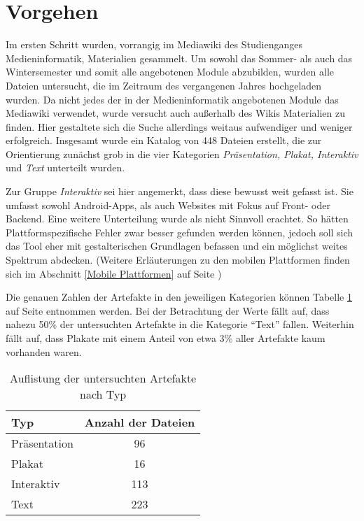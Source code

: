 
\section{Vorgehen}
Im ersten Schritt wurden, vorrangig im Mediawiki des Studienganges Medieninformatik, Materialien gesammelt. Um sowohl das Sommer- als auch das Wintersemester und somit alle angebotenen Module abzubilden, wurden alle Dateien untersucht, die im Zeitraum des vergangenen Jahres hochgeladen wurden.
Da nicht jedes der in der Medieninformatik angebotenen Module das Mediawiki verwendet, wurde versucht auch außerhalb des Wikis Materialien zu finden. Hier gestaltete sich die Suche allerdings weitaus aufwendiger und weniger erfolgreich.
Insgesamt wurde ein Katalog von 448 Dateien erstellt, die zur Orientierung zunächst grob in die vier Kategorien \textit{Präsentation, Plakat, Interaktiv} und \textit{Text} unterteilt wurden.

Zur Gruppe \textit{Interaktiv} sei hier angemerkt, dass diese bewusst weit gefasst ist. Sie umfasst sowohl Android-Apps, als auch Websites mit Fokus auf Front- oder Backend.
Eine weitere Unterteilung wurde als nicht Sinnvoll erachtet. So hätten Plattformspezifische Fehler zwar besser gefunden werden können, jedoch soll sich das Tool eher mit gestalterischen Grundlagen befassen und ein möglichst weites Spektrum abdecken. (Weitere Erläuterungen zu den mobilen Plattformen finden sich im Abschnitt \ref{Mobile Plattformen} auf Seite \pageref{Mobile Plattformen})

Die genauen Zahlen der Artefakte in den jeweiligen Kategorien können Tabelle \ref{table:types} auf Seite \pageref{table:types} entnommen werden. Bei der Betrachtung der Werte fällt auf, dass nahezu 50\% der untersuchten Artefakte in die Kategorie “Text” fallen. Weiterhin fällt auf, dass Plakate mit einem Anteil von etwa 3\% aller Artefakte kaum vorhanden waren.

\begin{table}[]
\centering
\begin{tabular}{|l|c|}
\hline
\textbf{Typ} & \multicolumn{1}{l|}{\textbf{Anzahl der Dateien}} \\ \hline
Präsentation & 96                                               \\ \hline
Plakat       & 16                                               \\ \hline
Interaktiv   & 113                                              \\ \hline
Text         & 223                                              \\ \hline
\end{tabular}
\caption{Auflistung der untersuchten Artefakte nach Typ}
\label{table:types}
\end{table}

